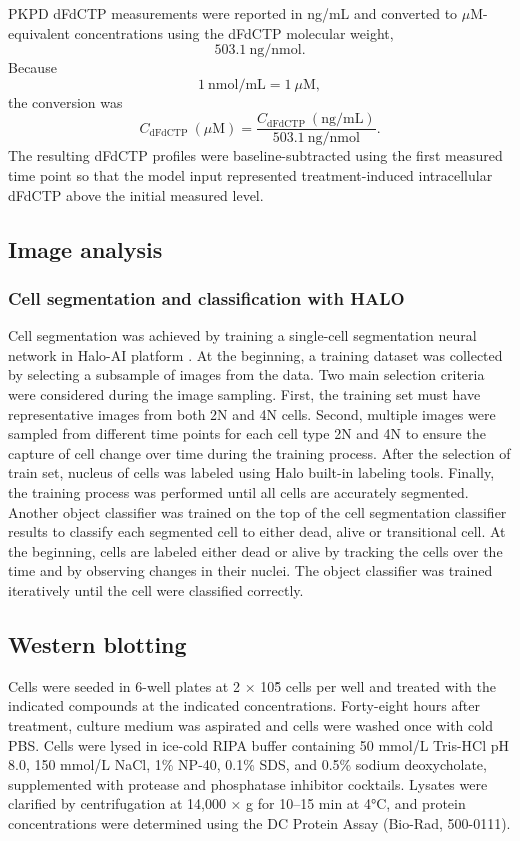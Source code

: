 \documentclass[11pt,notitlepage]{article}
\begin{document}
PKPD dFdCTP measurements were reported in ng/mL and converted to \(\mu\mathrm{M}\)-equivalent concentrations using the dFdCTP molecular weight,
\[
503.1~\mathrm{ng}/\mathrm{nmol}.
\]
Because
\[
1~\mathrm{nmol}/\mathrm{mL}=1~\mu\mathrm{M},
\]
the conversion was
\[
C_{\mathrm{dFdCTP}}~(\mu\mathrm{M})
=
\frac{C_{\mathrm{dFdCTP}}~(\mathrm{ng}/\mathrm{mL})}
{503.1~\mathrm{ng}/\mathrm{nmol}}.
\]
The resulting dFdCTP profiles were baseline-subtracted using the first measured time point so that the model input represented treatment-induced intracellular dFdCTP above the initial measured level.

\subsection{Image analysis}
 \subsubsection{Cell segmentation and classification with HALO}

Cell segmentation was achieved by training a single-cell segmentation neural network in Halo-AI platform \cite{indica_labs_halo_2023}. At the beginning, a training dataset was collected by selecting a subsample of images from the data. Two main selection criteria were considered during the image sampling. First, the training set must have representative images from both 2N and 4N cells. Second, multiple images were sampled from different time points for each cell type 2N and 4N to ensure the capture of cell change over time during the training process. After the selection of train set, nucleus of cells was labeled using Halo built-in labeling tools. Finally, the training process was performed until all cells are accurately segmented. 
Another object classifier was trained on the top of the cell segmentation classifier results to classify each segmented cell to either dead, alive or transitional cell. At the beginning, cells are labeled either dead or alive by tracking the cells over the time and by observing changes in their nuclei. The object classifier was trained iteratively until the cell were classified correctly.

\subsection{Western blotting}

Cells were seeded in 6-well plates at 2 × 10\^5 cells per well and treated with the indicated compounds at the indicated concentrations. Forty-eight hours after treatment, culture medium was aspirated and cells were washed once with cold PBS. Cells were lysed in ice-cold RIPA buffer containing 50 mmol/L Tris-HCl pH 8.0, 150 mmol/L NaCl, 1\% NP-40, 0.1\% SDS, and 0.5\% sodium deoxycholate, supplemented with protease and phosphatase inhibitor cocktails. Lysates were clarified by centrifugation at 14,000 × g for 10–15 min at 4°C, and protein concentrations were determined using the DC Protein Assay (Bio-Rad, 500-0111).
\end{document}
